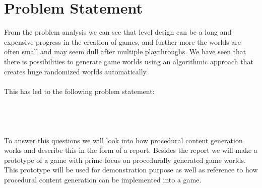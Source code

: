 \section{Problem Statement}

From the problem analysis we can see that level design can be a long and expensive progress in the creation of games, and further more the worlds are often small and may seem dull after multiple playthroughs. We have seen that there is possibilities to generate game worlds using an algorithmic approach that creates huge randomized worlds automatically.
\\\\
This has led to the following problem statement:
\\\\
\noindent{}
\\\\\\
To answer this questions we will look into how procedural content generation works and describe this in the form of a report. Besides the report we will make a prototype of a game with prime focus on procedurally generated game worlds. This prototype will be used for demonstration purpose as well as reference to how procedural content generation can be implemented into a game.